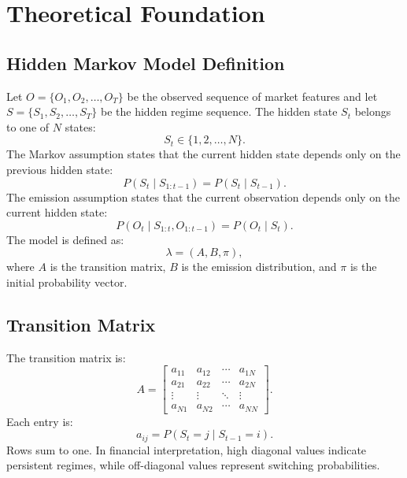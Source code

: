 \documentclass[12pt,a4paper]{report}
\begin{document}
\chapter{Theoretical Foundation}
\section{Hidden Markov Model Definition}
Let $O = \{O_1, O_2, \ldots, O_T\}$ be the observed sequence of market features and let $S = \{S_1, S_2, \ldots, S_T\}$ be the hidden regime sequence. The hidden state $S_t$ belongs to one of $N$ states:
\begin{equation}
    S_t \in \{1, 2, \ldots, N\}.
\end{equation}
The Markov assumption states that the current hidden state depends only on the previous hidden state:
\begin{equation}
    P(S_t \mid S_{1:t-1}) = P(S_t \mid S_{t-1}).
\end{equation}
The emission assumption states that the current observation depends only on the current hidden state:
\begin{equation}
    P(O_t \mid S_{1:t}, O_{1:t-1}) = P(O_t \mid S_t).
\end{equation}
The model is defined as:
\begin{equation}
    \lambda = (A, B, \pi),
\end{equation}
where $A$ is the transition matrix, $B$ is the emission distribution, and $\pi$ is the initial probability vector.

\section{Transition Matrix}
The transition matrix is:
\begin{equation}
A =
\begin{bmatrix}
a_{11} & a_{12} & \cdots & a_{1N}\\
a_{21} & a_{22} & \cdots & a_{2N}\\
\vdots & \vdots & \ddots & \vdots\\
a_{N1} & a_{N2} & \cdots & a_{NN}
\end{bmatrix}.
\end{equation}
Each entry is:
\begin{equation}
    a_{ij} = P(S_t=j \mid S_{t-1}=i).
\end{equation}
Rows sum to one. In financial interpretation, high diagonal values indicate persistent regimes, while off-diagonal values represent switching probabilities.
\end{document}
